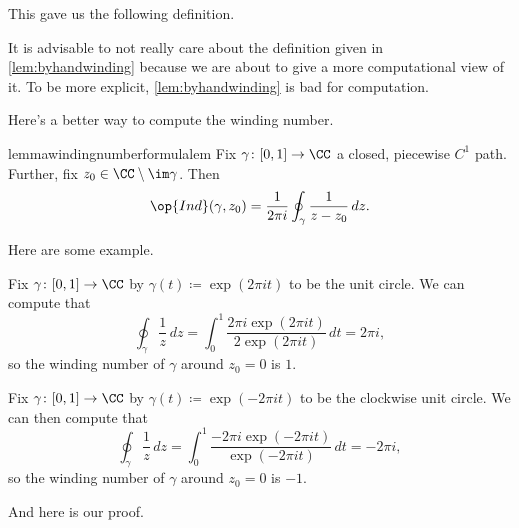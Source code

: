\documentclass[../notes.tex]{subfiles}
\begin{document}
This gave us the following definition.
\windingnumberdef*
\begin{remark}
	It is advisable to not really care about the definition given in \autoref{lem:byhandwinding} because we are about to give a more computational view of it. To be more explicit, \autoref{lem:byhandwinding} is bad for computation.
\end{remark}
Here's a better way to compute the winding number.
\begin{restatable}{lemma}{windingnumberformulalem} \label{lem:betterwinding}
	Fix $\gamma\colon [0,1]\to\CC$ a closed, piecewise $C^1$ path. Further, fix $z_0\in\CC\setminus\im\gamma$. Then
	\[\op{Ind}(\gamma,z_0)=\frac1{2\pi i}\oint_\gamma\frac1{z-z_0}\,dz.\]
\end{restatable}
\noindent Here are some example.
\begin{example}
	Fix $\gamma\colon [0,1]\to\CC$ by $\gamma(t)\coloneqq \exp(2\pi it)$ to be the unit circle. We can compute that
	\[\oint_\gamma\frac1z\,dz=\int_0^1\frac{2\pi i\exp(2\pi it)}{2\exp(2\pi it)}\,dt=2\pi i,\]
	so the winding number of $\gamma$ around $z_0=0$ is $1$.
\end{example}
\begin{example}
	Fix $\gamma\colon [0,1]\to\CC$ by $\gamma(t)\coloneqq \exp(-2\pi it)$ to be the clockwise unit circle. We can then compute that
	\[\oint_\gamma\frac1z\,dz=\int_0^1\frac{-2\pi i\exp(-2\pi it)}{\exp(-2\pi it)}\,dt=-2\pi i,\]
	so the winding number of $\gamma$ around $z_0=0$ is $-1$.
\end{example}
And here is our proof.
\end{document}
